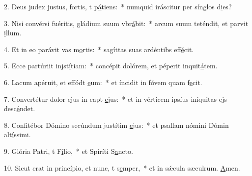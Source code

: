 2. Deus judex justus, fortis, t p\uline{á}tiens:~* numquid iráscitur per sínglos d\uline{i}es?\par 
3. Nisi convérsi fuéritis, gládium suum vbr\uline{á}bit:~* arcum suum teténdit, et parvit \uline{i}llum.\par 
4. Et in eo parávit vas m\uline{o}rtis:~* sagíttas suas ardéntibs eff\uline{é}cit.\par 
5. Ecce partúriit injst\uline{í}tiam:~* concépit dolórem, et péperit inquit\uline{á}tem.\par 
6. Lacum apéruit, et effódt \uline{e}um:~* et íncidit in fóvem quam f\uline{e}cit.\par 
7. Convertétur dolor ejus in capt \uline{e}jus:~* et in vérticem ipsíus iníquitas ejs desc\uline{é}ndet.\par 
8. Confitébor Dómino secúndum justítim \uline{e}jus:~* et psallam nómini Dómin alt\uline{í}ssimi.\par 
9. Glória Patri, t F\uline{í}lio,~* et Spiríti S\uline{a}ncto.\par 
10. Sicut erat in princípio, et nunc, t s\uline{e}mper,~* et in sǽcula sæculrum. \uline{A}men.\par 
